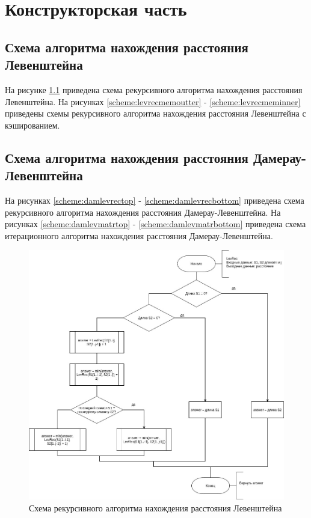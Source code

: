 \chapter{Конструкторская часть}

\section{Схема алгоритма нахождения расстояния Левенштейна}
На рисунке \ref{scheme:levrec} приведена схема рекурсивного алгоритма нахождения
расстояния Левенштейна.
На рисунках \ref{scheme:levrecmemoutter} - \ref{scheme:levrecmeminner} приведены схемы рекурсивного алгоритма нахождения расстояния Левенштейна с кэшированием.


\section{Схема алгоритма нахождения расстояния Дамерау-Левенштейна}
На рисунках \ref{scheme:damlevrectop} - \ref{scheme:damlevrecbottom} приведена схема рекурсивного алгоритма нахождения расстояния Дамерау-Левенштейна.
На рисунках \ref{scheme:damlevmatrtop} - \ref{scheme:damlevmatrbottom} приведена схема итерационного алгоритма нахождения расстояния Дамерау-Левенштейна.


\begin{figure}[h]
	\centering
	\includegraphics[scale=0.51]{schemes/LevRec.jpg}
	\caption{Схема рекурсивного алгоритма нахождения расстояния Левенштейна}
	\label{scheme:levrec}
\end{figure}

